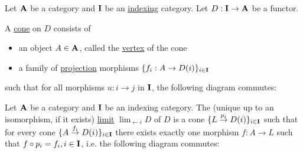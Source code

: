 \begin{definition}\label{def:categorical_cone}\cite[definition 5.1.19(a)]{Leinster2014}
  Let $\operatorname{\mathbf{A}}$ be a category and $\operatorname{\mathbf{I}}$ be an \uline{indexing} category. Let $D: \operatorname{\mathbf{I}} \to \operatorname{\mathbf{A}}$ be a functor.

  A \uline{cone} on $D$ consists of
  \begin{itemize}
    \item an object $A \in \operatorname{\mathbf{A}}$, called the \uline{vertex} of the cone
    \item a family of \uline{projection} morphisms $\{ f_i: A \to D(i) \}_{i \in \operatorname{\mathbf{I}}}$
  \end{itemize}
  such that for all morphisms $u: i \to j$ in $\operatorname{\mathbf{I}}$, the following diagram commutes:
  \begin{center}
  \end{center}
\end{definition}

\begin{definition}\label{def:categorical_limit}\cite[definition 5.1.19(b)]{Leinster2014}
  Let $\operatorname{\mathbf{A}}$ be a category and $\operatorname{\mathbf{I}}$ be an indexing category. The (unique up to an isomorphism, if it exists) \uline{limit} $\displaystyle\lim_{\leftarrow i} D$ of $D$ is a cone $\{ L \overset {p_i} \to D(i) \}_{i \in \operatorname{\mathbf{I}}}$ such that for every cone $\{ A \overset {f_i} \to D(i) \}_{i \in \operatorname{\mathbf{I}}}$ there exists exactly one morphism $f: A \to L$ such that $f \circ p_i = f_i, i \in \operatorname{\mathbf{I}}$, i.e. the following diagram commutes:
  \begin{center}
  \end{center}
\end{definition}

